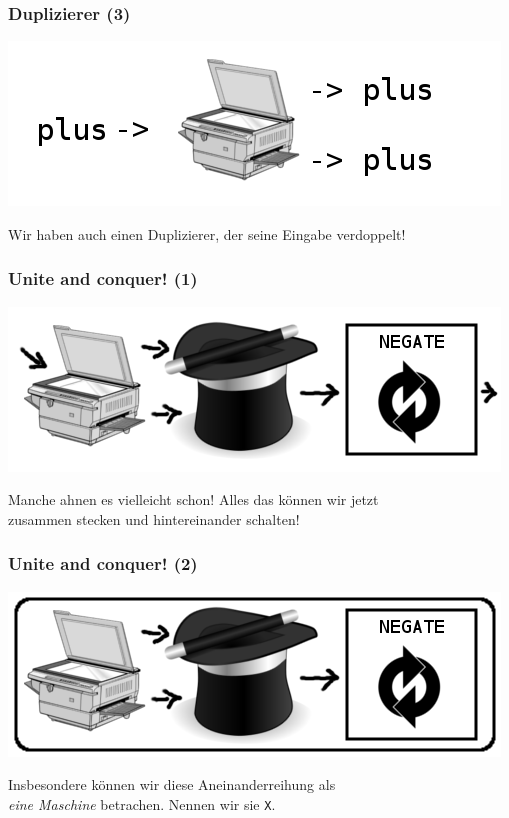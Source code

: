 \documentclass[aspectratio=169]{beamer}
\begin{document}

\begin{frame}
\frametitle{Duplizierer (3)}
\begin{center}
\includegraphics[scale=1.4]{images/erklaerung08.png}
\bigskip

Wir haben auch einen Duplizierer, der seine Eingabe verdoppelt!
\end{center}
\end{frame}


\begin{frame}
\frametitle{Unite and conquer! (1)}
\begin{center}
\includegraphics[scale=1.4]{images/complete.png} 
\bigskip

Manche ahnen es vielleicht schon! Alles das können wir jetzt\\ zusammen stecken und hintereinander schalten!
\end{center}
\end{frame}


\begin{frame}
\frametitle{Unite and conquer! (2)}
\begin{center}
\includegraphics[scale=1.4]{images/complete_border.png} 
\bigskip

Insbesondere können wir diese Aneinanderreihung als\\ \emph{eine Maschine} betrachen. Nennen wir sie \texttt{X}.
\end{center}
\end{frame}
\end{document}
